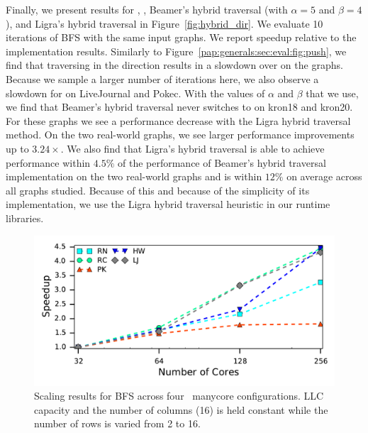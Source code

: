 \hybridresults
Finally, we present results for \push, \pull, Beamer's hybrid traversal (with $\alpha=5$ and $\beta=4$), and Ligra's hybrid traversal in Figure~\ref{fig:hybrid_dir}.
We evaluate 10 iterations of BFS with the same input graphs. 
We report speedup relative to the \push implementation results.
Similarly to Figure~\ref{pap:generals:sec:eval:fig:push}, we find that traversing in the \pull direction results in a slowdown over \push on the \kron graphs. 
Because we sample a larger number of iterations here, we also observe a slowdown for \pull on LiveJournal and Pokec. 
With the values of $\alpha$ and $\beta$ that we use, we find that Beamer's hybrid traversal never switches to \pull on kron18 and kron20. 
For these graphs we see a performance decrease with the Ligra hybrid traversal method.
On the two real-world graphs, we see larger performance improvements up to $3.24\times$.
We also find that Ligra's hybrid traversal is able to achieve performance within $4.5\%$ of the performance of Beamer's hybrid traversal implementation on the two real-world graphs and is within $12\%$ on average across all graphs studied.
Because of this and because of the simplicity of its implementation, we use the Ligra hybrid traversal heuristic in our runtime libraries.
 

\begin{figure}[ht]
    \centering
    \includegraphics[scale = 0.65]{graphit-figures/hb-scaling-speedup.pdf}
    \caption{Scaling results for BFS across four \hb~manycore configurations. LLC capacity and the number of columns (16) is held constant while the number of rows is varied from 2 to 16.} 
    \label{pap:generals:sec:eval:fig:scaling}
\end{figure}

\hbBlockingEvalTab

